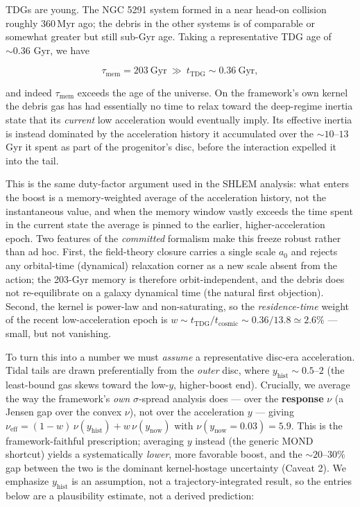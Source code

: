 \documentclass[
]{article}
\begin{document}
TDGs are young. The NGC 5291 system formed in a near head-on collision
roughly \(360\,\mathrm{Myr}\) ago; the debris in the other systems is of
comparable or somewhat greater but still sub-Gyr age. Taking a
representative TDG age of \(\sim\!0.36\) Gyr, we have

\[
\tau_\mathrm{mem} = 203\ \mathrm{Gyr}\ \gg\ t_\mathrm{TDG}\sim 0.36\ \mathrm{Gyr},
\]

and indeed \(\tau_\mathrm{mem}\) exceeds the age of the universe. On the
framework's own kernel the debris gas has had essentially no time to
relax toward the deep-regime inertia state that its \emph{current} low
acceleration would eventually imply. Its effective inertia is instead
dominated by the acceleration history it accumulated over the
\(\sim\!10\)--\(13\) Gyr it spent as part of the progenitor's disc,
before the interaction expelled it into the tail.

This is the same duty-factor argument used in the SHLEM analysis: what
enters the boost is a memory-weighted average of the acceleration
history, not the instantaneous value, and when the memory window vastly
exceeds the time spent in the current state the average is pinned to the
earlier, higher-acceleration epoch. Two features of the \emph{committed}
formalism make this freeze robust rather than ad hoc. First, the
field-theory closure carries a single scale \(a_0\) and rejects any
orbital-time (dynamical) relaxation corner as a new scale absent from
the action; the 203-Gyr memory is therefore orbit-independent, and the
debris does not re-equilibrate on a galaxy dynamical time (the natural
first objection). Second, the kernel is power-law and non-saturating, so
the \emph{residence-time} weight of the recent low-acceleration epoch is
\(w\sim t_\mathrm{TDG}/t_\mathrm{cosmic}\sim 0.36/13.8 \simeq 2.6\%\) ---
small, but not vanishing.

To turn this into a number we must \emph{assume} a representative
disc-era acceleration. Tidal tails are drawn preferentially from the
\emph{outer} disc, where \(y_\mathrm{hist}\sim 0.5\)--\(2\) (the
least-bound gas skews toward the low-\(y\), higher-boost end).
Crucially, we average the way the framework's \emph{own}
\(\sigma\)-spread analysis does --- over the \textbf{response} \(\nu\)
(a Jensen gap over the convex \(\nu\)), not over the acceleration \(y\)
--- giving
\(\nu_\mathrm{eff}=(1-w)\,\nu(y_\mathrm{hist})+w\,\nu(y_\mathrm{now})\) with
\(\nu(y_\mathrm{now}{=}0.03)=5.9\). This is the framework-faithful
prescription; averaging \(y\) instead (the generic MOND shortcut) yields
a systematically \emph{lower}, more favorable boost, and the
\(\sim\!20\)--\(30\%\) gap between the two is the dominant
kernel-hostage uncertainty (Caveat 2). We emphasize \(y_\mathrm{hist}\) is
an assumption, not a trajectory-integrated result, so the entries below
are a plausibility estimate, not a derived prediction:
\end{document}
